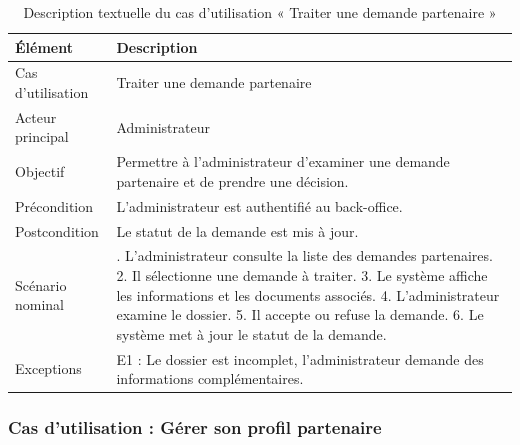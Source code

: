 \begin{table}[H]
\centering
\caption{Description textuelle du cas d’utilisation « Traiter une demande partenaire »}
\label{tableau:4-3}
\renewcommand{\arraystretch}{1.2}
\begin{tabularx}{\textwidth}{|>{\raggedright\arraybackslash}X|>{\raggedright\arraybackslash}X|}
\hline
\rowcolor[HTML]{ECF4FF}
\textbf{Élément} & \textbf{Description} \\
\hline
Cas d’utilisation & Traiter une demande partenaire \\
\hline
Acteur principal & Administrateur \\
\hline
Objectif & Permettre à l’administrateur d’examiner une demande partenaire et de prendre une décision. \\
\hline
Précondition & L’administrateur est authentifié au back-office. \\
\hline
Postcondition & Le statut de la demande est mis à jour. \\
\hline
Scénario nominal & 1. L’administrateur consulte la liste des demandes partenaires.\newline{} 2. Il sélectionne une demande à traiter.\newline{} 3. Le système affiche les informations et les documents associés.\newline{} 4. L’administrateur examine le dossier.\newline{} 5. Il accepte ou refuse la demande.\newline{} 6. Le système met à jour le statut de la demande. \\
\hline
Exceptions & E1 : Le dossier est incomplet, l’administrateur demande des informations complémentaires. \\
\hline
\end{tabularx}
\end{table}


\subsubsection{Cas d’utilisation : Gérer son profil partenaire}


